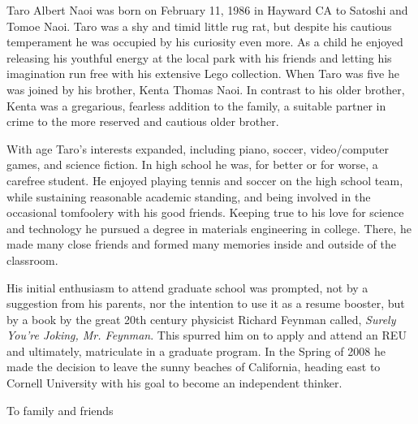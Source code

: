 \documentclass[phd,tocprelim,cornellheadings,final,]{cornell}
\begin{document}
\begin{biosketch}
Taro Albert Naoi was born on February 11, 1986 in Hayward CA to Satoshi and Tomoe Naoi. Taro was a shy and timid little rug rat, but despite his cautious temperament he was occupied by his curiosity even more. As a child he enjoyed releasing his youthful energy at the local park with his friends and letting his imagination run free with his extensive Lego collection. When Taro was five he was joined by his brother, Kenta Thomas Naoi. In contrast to his older brother, Kenta was a gregarious, fearless addition to the family, a suitable partner in crime to the more reserved and cautious older brother.

With age Taro's interests expanded, including piano, soccer, video/computer games, and science fiction. In high school he was, for better or for worse, a carefree student. He enjoyed playing tennis and soccer on the high school team, while sustaining reasonable academic standing, and being involved in the occasional tomfoolery with his good friends. Keeping true to his love for science and technology he pursued a degree in materials engineering in college. There, he made many close friends and formed many memories inside and outside of the classroom. 

His initial enthusiasm to attend graduate school was prompted, not by a suggestion from his parents, nor the intention to use it as a resume booster, but by a book by the great 20th century physicist Richard Feynman called, \emph{Surely You're Joking, Mr. Feynman}. This spurred him on to apply and attend an REU and ultimately, matriculate in a graduate program. In the Spring of 2008 he made the decision to leave the sunny beaches of California, heading east to Cornell University with his goal to become an independent thinker. 
\end{biosketch}

\begin{dedication}
To family and friends
\end{dedication}
\end{document}

